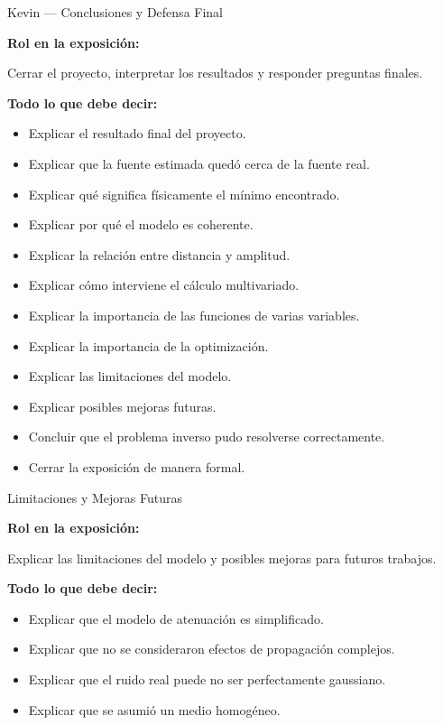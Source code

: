 \documentclass[aspectratio=169]{beamer}
\begin{document}
\begin{frame}{Kevin — Conclusiones y Defensa Final}

\textbf{Rol en la exposición:}

Cerrar el proyecto, interpretar los resultados y responder preguntas finales.

\vspace{0.4cm}

\textbf{Todo lo que debe decir:}

\begin{itemize}
    \item Explicar el resultado final del proyecto.
    \item Explicar que la fuente estimada quedó cerca de la fuente real.
    \item Explicar qué significa físicamente el mínimo encontrado.
    \item Explicar por qué el modelo es coherente.
    \item Explicar la relación entre distancia y amplitud.
    \item Explicar cómo interviene el cálculo multivariado.
    \item Explicar la importancia de las funciones de varias variables.
    \item Explicar la importancia de la optimización.
    \item Explicar las limitaciones del modelo.
    \item Explicar posibles mejoras futuras.
    \item Concluir que el problema inverso pudo resolverse correctamente.
    \item Cerrar la exposición de manera formal.
\end{itemize}

\end{frame}


\begin{frame}{Limitaciones y Mejoras Futuras}

\textbf{Rol en la exposición:}

Explicar las limitaciones del modelo y posibles mejoras para futuros trabajos.

\vspace{0.4cm}

\textbf{Todo lo que debe decir:}

\begin{itemize}
    \item Explicar que el modelo de atenuación es simplificado.
    \item Explicar que no se consideraron efectos de propagación complejos.
    \item Explicar que el ruido real puede no ser perfectamente gaussiano.
    \item Explicar que se asumió un medio homogéneo.
\end{itemize}

\end{frame}
\end{document}

